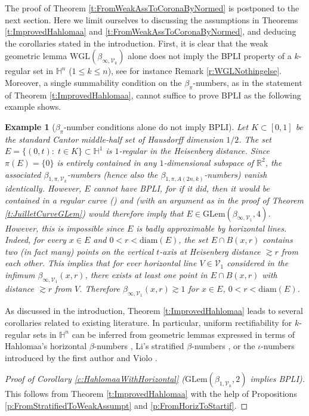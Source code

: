 \documentclass[12pt]{amsart}
\renewcommand{\H}{\mathbb H}
\numberwithin{equation}{section}
\theoremstyle{plain}
\newtheorem{example}[theorem]{Example}
\theoremstyle{definition}
\theoremstyle{remark}
\begin{document}
The proof of Theorem \ref{t:FromWeakAssToCoronaByNormed} is postponed to the next section. Here we limit ourselves to discussing the assumptions in Theorems \ref{t:ImprovedHahlomaa}  and \ref{t:FromWeakAssToCoronaByNormed}, and deducing the corollaries stated in the introduction. First, it is clear that the weak geometric lemma $\mathrm{WGL}(\beta_{\infty,\mathcal{V}_k})$ alone does not imply the BPLI property of a $k$-regular set in $\mathbb{H}^n$ ($1\leq k\leq n$), see for instance Remark \ref{r:WGLNothingelse}. Moreover, a single summability condition on the $\beta_\pi$-numbers, as in the statement of Theorem \ref{t:ImprovedHahlomaa}, cannot suffice to prove BPLI as the following example shows.

\begin{example}[$\beta_{\pi}$-number conditions alone do not imply BPLI]\label{ex:ProjBetaNotEnough} Let $K\subset [0,1]$ be the standard Cantor middle-half set of Hausdorff dimension $1/2$. The set $E=\{(0,t):\; t\in K\}\subset \mathbb{H}^1$ is $1$-regular in the Heisenberg distance. Since $\pi(E)=\{0\}$ is entirely contained in any $1$-dimensional subspace of $\mathbb{R}^{2}$, the associated $\beta_{1,\pi,\mathcal{V}_k}$-numbers (hence also the $\beta_{1,\pi,A(2n,k)}$-numbers) vanish identically. However, $E$ cannot have BPLI, for if it did, then it would be contained in a regular curve (\cite[Corollary 4.6]{FV1}) and \cite{LiSchul1} (with an argument as in the proof of Theorem \ref{t:JuilletCurveGLem}) would therefore imply that $E\in \mathrm{GLem}(\beta_{\infty,\mathcal{V}_1},4)$.
However, this is impossible since $E$ is badly approximable by horizontal lines. Indeed, for every $x\in E$ and $0<r<\mathrm{diam}(E)$, the set $E\cap B(x,r)$ contains two (in fact many) points on the vertical $t$-axis at Heisenberg distance $\gtrsim r$ from each other. This implies that for ever horizontal line $V\in \mathcal{V}_1$ considered in the infimum $\beta_{\infty,\mathcal{V}_1}(x,r)$, there exists at least one point in $E\cap B(x,r)$ with distance $\gtrsim r$ from $V$. Therefore $\beta_{\infty,\mathcal{V}_1}(x,r)\gtrsim 1$ for $x\in E$, $0<r<\mathrm{diam}(E)$.
\end{example}



As discussed in the introduction, Theorem \ref{t:ImprovedHahlomaa} leads to several corollaries related to existing literature. In particular, uniform rectifiability for $k$-regular sets in $\H^n$ can be inferred from geometric lemmas expressed in terms of Hahlomaa's  horizontal $\beta$-numbers \cite{Hahlomaa}, Li's stratified $\beta$-numbers \cite{Li}, or the $\iota$-numbers introduced by the first author and Violo \cite{FV1}.
    \begin{proof}[Proof of Corollary \ref{c:HahlomaaWithHorizontal} ($\mathrm{GLem}(\beta_{1,\mathcal{V}_k},2)$ implies BPLI)]
  This follows from Theorem \ref{t:ImprovedHahlomaa}       with the help of Propositions \ref{p:FromStratifiedToWeakAssumpt} and \ref{p:FromHorizToStartif}.
    \end{proof}
\end{document}

